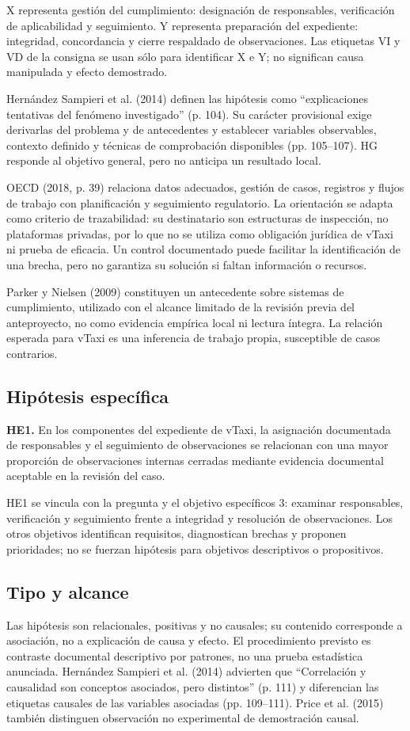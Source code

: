 {X representa gestión del cumplimiento: designación de responsables, verificación de aplicabilidad y seguimiento. Y representa preparación del expediente: integridad, concordancia y cierre respaldado de observaciones. Las etiquetas VI y VD de la consigna se usan sólo para identificar X e Y; no significan causa manipulada y efecto demostrado.

Hernández Sampieri et al. (2014) definen las hipótesis como ``explicaciones tentativas del fenómeno investigado'' (p. 104). Su carácter provisional exige derivarlas del problema y de antecedentes y establecer variables observables, contexto definido y técnicas de comprobación disponibles (pp. 105--107). HG responde al objetivo general, pero no anticipa un resultado local.

OECD (2018, p. 39) relaciona datos adecuados, gestión de casos, registros y flujos de trabajo con planificación y seguimiento regulatorio. La orientación se adapta como criterio de trazabilidad: su destinatario son estructuras de inspección, no plataformas privadas, por lo que no se utiliza como obligación jurídica de vTaxi ni prueba de eficacia. Un control documentado puede facilitar la identificación de una brecha, pero no garantiza su solución si faltan información o recursos.

Parker y Nielsen (2009) constituyen un antecedente sobre sistemas de cumplimiento, utilizado con el alcance limitado de la revisión previa del anteproyecto, no como evidencia empírica local ni lectura íntegra. La relación esperada para vTaxi es una inferencia de trabajo propia, susceptible de casos contrarios.

\subsection{Hipótesis específica}
\textbf{HE1.} En los componentes del expediente de vTaxi, la asignación documentada de responsables y el seguimiento de observaciones se relacionan con una mayor proporción de observaciones internas cerradas mediante evidencia documental aceptable en la revisión del caso.

HE1 se vincula con la pregunta y el objetivo específicos 3: examinar responsables, verificación y seguimiento frente a integridad y resolución de observaciones. Los otros objetivos identifican requisitos, diagnostican brechas y proponen prioridades; no se fuerzan hipótesis para objetivos descriptivos o propositivos.

\subsection{Tipo y alcance}
Las hipótesis son relacionales, positivas y no causales; su contenido corresponde a asociación, no a explicación de causa y efecto. El procedimiento previsto es contraste documental descriptivo por patrones, no una prueba estadística anunciada. Hernández Sampieri et al. (2014) advierten que ``Correlación y causalidad son conceptos asociados, pero distintos'' (p. 111) y diferencian las etiquetas causales de las variables asociadas (pp. 109--111). Price et al. (2015) también distinguen observación no experimental de demostración causal.

}
